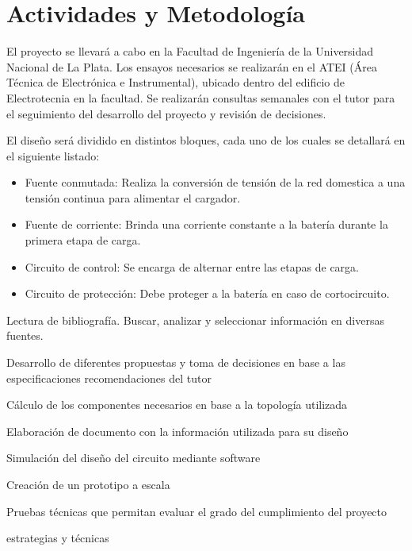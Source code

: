 \section*{Actividades y Metodología}
El proyecto se llevará a cabo en la Facultad de Ingeniería de la Universidad Nacional de La Plata.
Los ensayos necesarios se realizarán en el ATEI (Área Técnica de Electrónica e Instrumental),
ubicado dentro del edificio de Electrotecnia en la facultad.
Se realizarán consultas semanales con el tutor para el seguimiento del desarrollo del proyecto y revisión de decisiones.

El diseño será dividido en distintos bloques, cada uno de los cuales se detallará en el siguiente listado:
\begin{itemize}
    \item Fuente conmutada: Realiza la conversión de tensión de la red domestica a una tensión continua para alimentar el cargador.
    \item Fuente de corriente: Brinda una corriente constante a la batería durante la primera etapa de carga.
    \item Circuito de control: Se encarga de alternar entre las etapas de carga.
    \item Circuito de protección: Debe proteger a la batería en caso de cortocircuito.
\end{itemize} 

Lectura de bibliografía. Buscar, analizar y seleccionar información en diversas fuentes.

Desarrollo de diferentes propuestas y toma de decisiones en base a las especificaciones recomendaciones del tutor

Cálculo de los componentes necesarios en base a la topología utilizada

Elaboración de documento con la información utilizada para su diseño 

Simulación del diseño del circuito mediante software

Creación de un prototipo a escala

Pruebas técnicas que permitan evaluar el grado del cumplimiento del proyecto

estrategias y técnicas